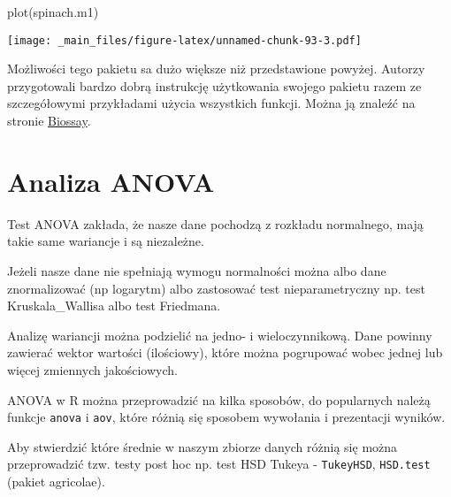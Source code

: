 \documentclass[
]{book}
\newenvironment{Shaded}{\begin{snugshade}}{\end{snugshade}}
\newcommand{\FunctionTok}[1]{\textcolor[rgb]{0.00,0.00,0.00}{#1}}
\newcommand{\NormalTok}[1]{#1}
\begin{document}
\begin{Shaded}
\begin{Highlighting}[]
\FunctionTok{plot}\NormalTok{(spinach.m1)}
\end{Highlighting}
\end{Shaded}

\texttt{[image: \_main\_files/figure-latex/unnamed-chunk-93-3.pdf]}

Możliwości tego pakietu sa dużo większe niż przedstawione powyżej. Autorzy przygotowali bardzo dobrą instrukcję użytkowania swojego pakietu razem ze szczegółowymi przykładami użycia wszystkich funkcji. Można ją znaleźć na stronie \href{http://www.bioassay.dk/}{Biossay}.

\hypertarget{analiza-anova}{%
\section{Analiza ANOVA}\label{analiza-anova}}

Test ANOVA zakłada, że nasze dane pochodzą z rozkładu normalnego, mają takie same wariancje i są niezależne.

Jeżeli nasze dane nie spełniają wymogu normalności można albo dane znormalizować (np logarytm) albo zastosować test nieparametryczny np. test Kruskala\_Wallisa albo test Friedmana.

Analizę wariancji można podzielić na jedno- i wieloczynnikową. Dane powinny zawierać wektor wartości (ilościowy), które można pogrupować wobec jednej lub więcej zmiennych jakościowych.

ANOVA w R można przeprowadzić na kilka sposobów, do popularnych należą funkcje \texttt{anova} i \texttt{aov}, które różnią się sposobem wywołania i prezentacji wyników.

Aby stwierdzić które średnie w naszym zbiorze danych różnią się można przeprowadzić tzw. testy post hoc np. test HSD Tukeya - \texttt{TukeyHSD}, \texttt{HSD.test} (pakiet agricolae).
\end{document}
